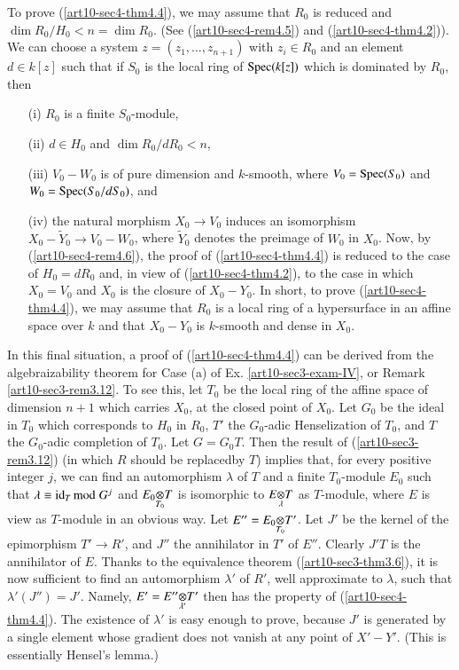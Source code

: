 \begin{remark}\label{art10-sec4-rem4.7}
To prove (\ref{art10-sec4-thm4.4}), we may assume that $R_{0}$ is reduced and $\dim R_{0}/H_{0}<n=\dim R_{0}$. (See (\ref{art10-sec4-rem4.5}) and (\ref{art10-sec4-thm4.2})). We can choose a system $z=(z_{1},\ldots,z_{n+1})$ with $z_{i}\in R_{0}$ and an element $d\in k[z]$ such that if $S_{0}$ is the local ring of $\operatorname{\mathrm{Spec}} (k[z])$ which is dominated by $R_{0}$, then
\begin{itemize}
\item[(i)] $R_{0}$ is a finite $S_{0}$-module,

\item[(ii)] $d\in H_{0}$ and $\dim R_{0}/dR_{0}<n$,

\item[(iii)] $V_{0}-W_{0}$ is of pure dimension and $k$-smooth, where $V_{0}=\operatorname{\mathrm{Spec}} (S_{0})$ and $W_{0}=\operatorname{\mathrm{Spec}} (S_{0}/dS_{0})$, and 

\item[(iv)] the natural morphism $X_{0}\to V_{0}$ induces an isomorphism $X_{0}-\widetilde{Y}_{0}\to V_{0}-W_{0}$, where $\widetilde{Y}_{0}$ denotes the preimage of $W_{0}$ in $X_{0}$. Now, by (\ref{art10-sec4-rem4.6}), the proof of (\ref{art10-sec4-thm4.4}) is reduced to the case of $H_{0}=dR_{0}$ and, in view of (\ref{art10-sec4-thm4.2}), to the case in which $X_{0}=V_{0}$ and $X_{0}$ is the closure of $X_{0}-Y_{0}$. In short, to prove (\ref{art10-sec4-thm4.4}), we may assume that $R_{0}$ is a local ring of a hypersurface in an affine space over $k$ and that $X_{0}-Y_{0}$ is $k$-smooth and dense in $X_{0}$.
\end{itemize}

In this final situation, a proof of (\ref{art10-sec4-thm4.4}) can be derived from the algebraizability theorem for Case (a) of Ex. \ref{art10-sec3-exam-IV}, or Remark \ref{art10-sec3-rem3.12}. To see this, let $T_{0}$ be the local ring of the affine space of dimension $n+1$ which carries $X_{0}$, at the closed point of $X_{0}$. Let $G_{0}$ be the ideal in $T_{0}$ which corresponds to $H_{0}$ in $R_{0}$, $T'$ the $G_{0}$-adic Henselization of $T_{0}$, and $T$ the $G_{0}$-adic completion of $T_{0}$. Let $G=G_{0}T$. Then the result of (\ref{art10-sec3-rem3.12}) (in which $R$ should be replaced\pageoriginale by $T$) implies that, for every positive integer $j$, we can find an automorphism $\lambda$ of $T$ and a finite $T_{0}$-module $E_{0}$ such that $\lambda\equiv\operatorname{\mathrm{id}}_{T}{\rm{mod}}\kern.3em G^{j}$ and $\foprod{E_{0}}{T}{T_{0}}$ is isomorphic to $\foprod{E}{T}{\lambda}$ as $T$-module, where $E$ is view as $T$-module in an obvious way. Let $E''=\foprod{E_{0}}{T'}{T_{0}}$. Let $J'$ be the kernel of the epimorphism $T'\to R'$, and $J''$ the annihilator in $T'$ of $E''$. Clearly $J'T$ is the annihilator of $E$. Thanks to the equivalence theorem (\ref{art10-sec3-thm3.6}), it is now sufficient to find an automorphism $\lambda'$ of $R'$, well approximate to $\lambda$, such that $\lambda'(J'')=J'$. Namely, $E'=\foprod{E''}{T'}{\lambda'}$ then has the property of (\ref{art10-sec4-thm4.4}). The existence of $\lambda'$ is easy enough to prove, because $J'$ is generated by a single element whose gradient does not vanish at any point of $X'-Y'$. (This is essentially Hensel's lemma.)
\end{remark}

